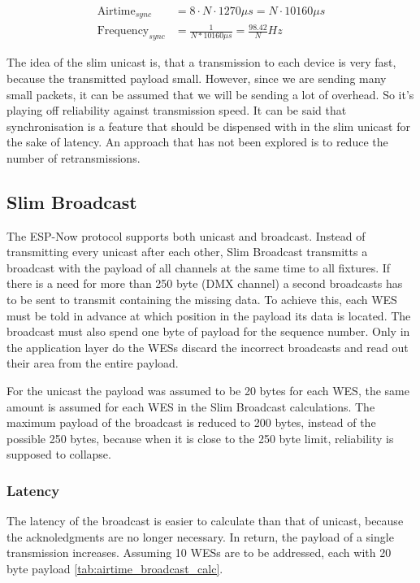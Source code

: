 \begin{align} 
	\text{Airtime}_{sync} &= 8 \cdot N \cdot 1270\mu s = N \cdot 10160\mu s \\
	\text{Frequency}_{sync} &= \frac{1}{N * 10160\mu s} = \frac{98.42}{N} Hz
\end{align} 

The idea of the slim unicast is, that a transmission to each device is very fast, because the transmitted payload small.
However, since we are sending many small packets, it can be assumed that we will be sending a lot of overhead.
So it's playing off reliability against transmission speed.
It can be said that synchronisation is a feature that should be dispensed with in the slim unicast for the sake of latency.
An approach that has not been explored is to reduce the number of retransmissions.

\subsection*{Slim Broadcast}

The ESP-Now protocol supports both unicast and broadcast.
Instead of transmitting every unicast after each other, 
Slim Broadcast transmitts a broadcast with the payload of all channels at the same time to all fixtures.
If there is a need for more than 250 byte (DMX channel) a second broadcasts has to be sent to transmit containing the missing data.
To achieve this, each WES must be told in advance at which position in the payload its data is located.
The broadcast must also spend one byte of payload for the sequence number.
Only in the application layer do the WESs discard the incorrect broadcasts and read out their area from the entire payload.

For the unicast the payload was assumed to be 20 bytes for each WES, the same amount is assumed for each WES in the Slim Broadcast calculations.
The maximum payload of the broadcast is reduced to 200 bytes, instead of the possible 250 bytes, 
because when it is close to the 250 byte limit, reliability is supposed to collapse.

\subsubsection*{Latency}

The latency of the broadcast is easier to calculate than that of unicast, because the acknoledgments are no longer necessary.
In return, the payload of a single transmission increases.
Assuming 10 WESs are to be addressed, each with 20 byte payload \ref{tab:airtime_broadcast_calc}.

